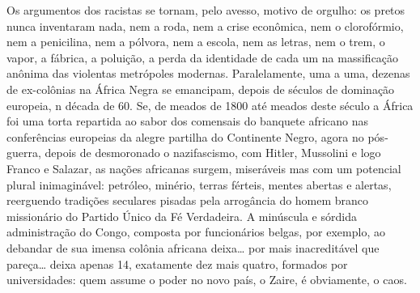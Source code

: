 \documentclass[
  letterpaper,
  DIV=11,
  numbers=noendperiod]{scrreprt}
\begin{document}
Os argumentos dos racistas se tornam, pelo avesso, motivo de orgulho: os
pretos nunca inventaram nada, nem a roda, nem a crise econômica, nem o
clorofórmio, nem a penicilina, nem a pólvora, nem a escola, nem as
letras, nem o trem, o vapor, a fábrica, a poluição, a perda da
identidade de cada um na massificação anônima das violentas metrópoles
modernas. Paralelamente, uma a uma, dezenas de ex-colônias na África
Negra se emancipam, depois de séculos de dominação europeia, n década de
60. Se, de meados de 1800 até meados deste século a África foi uma torta
repartida ao sabor dos comensais do banquete africano nas conferências
europeias da alegre partilha do Continente Negro, agora no pós-guerra,
depois de desmoronado o nazifascismo, com Hitler, Mussolini e logo
Franco e Salazar, as nações africanas surgem, miseráveis mas com um
potencial plural inimaginável: petróleo, minério, terras férteis, mentes
abertas e alertas, reerguendo tradições seculares pisadas pela
arrogância do homem branco missionário do Partido Único da Fé
Verdadeira. A minúscula e sórdida administração do Congo, composta por
funcionários belgas, por exemplo, ao debandar de sua imensa colônia
africana deixa\ldots{} por mais inacreditável que pareça\ldots{} deixa
apenas 14, exatamente dez mais quatro, formados por universidades: quem
assume o poder no novo país, o Zaire, é obviamente, o caos.
\end{document}
